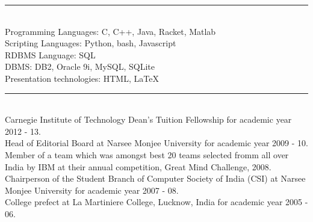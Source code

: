 \documentclass[a4paper,oneside,english]{article}
\begin{document}
\noindent\rule{6in}{0.4pt} \\[4pt]
Programming Languages: C, C++, Java, Racket, Matlab \vspace*{2mm}  \\
Scripting Languages: Python, bash, Javascript \vspace*{2mm} \\ 
RDBMS Language: SQL \vspace*{2mm} \\  
DBMS: DB2, Oracle 9i, MySQL, SQLite \vspace*{2mm} \\ 
Presentation technologies: HTML, \LaTeX \\
\clearpage
\noindent\rule{6in}{0.4pt} \\[4pt]
Carnegie Institute of Technology Dean's Tuition Fellowship for academic year 2012 - 13. \vspace*{2mm} \\
Head of Editorial Board at Narsee Monjee University for academic year 2009 - 10. \vspace*{2mm} \\
\noindent Member of a team which was amongst best 20 teams selected fromm all over India by IBM at their annual competition, Great Mind Challenge, 2008. \vspace*{2mm} \\
Chairperson of the Student Branch of Computer Society of India (CSI) at Narsee Monjee University for academic year 2007 - 08.  \vspace*{2mm} \\
College prefect at La Martiniere College, Lucknow, India for academic year 2005 - 06.
\end{document}
